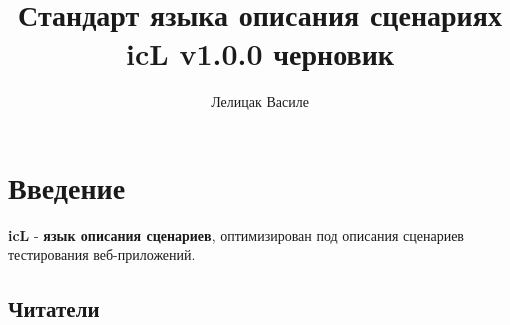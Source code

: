 \documentclass[a4paper, 14pt]{extarticle}
\begin{document}
\newcommand{\tableuni}[6]{
	\begin{longtable}[h]{#1}
	\caption*{Таблица \thetable{}: #5} \label{#4} \\

	\hline
	#2
	#3
	\endfirsthead

	\multicolumn{3}{l}%
	{{Продолжение таблицы \thetable{}: #5}} \\
	#3
	\endhead

	\hline
	\endfoot

	\hline
	\endlastfoot
#6
	\end{longtable}
}

\newcommand{\stableuni}[6]{
	\begin{longtable}[h]{#1}
	\caption*{Таблица \thetable{}: #4} \label{#3} \\

	\hline
	#2
	\hline
	\endfirsthead

	\multicolumn{3}{l}%
	{{Продолжение таблицы \thetable{}: #4}} \\
	\hline
	#2
	\hline
	\endhead

	\hline
	\endfoot

	\hline
	\endlastfoot
#5
	\end{longtable}
}


\title{Стандарт языка описания сценариях icL v1.0.0 черновик}
\author{Лелицак Василе}

\maketitle

\newpage
\renewcommand{\contentsname}{\textsf{Оглавление}}
\tableofcontents
	
\newpage

\section{Введение}	
	
\indent \textbf{icL} - \textbf{язык описания сценариев}, оптимизирован под описания сценариев тестирования веб-приложений.
	
\subsection{Читатели}
	
\end{document}
